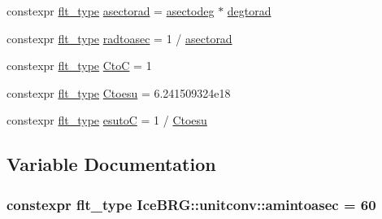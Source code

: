 \begin{DoxyCompactItemize}
constexpr \hyperlink{lib_2IceBRG__main_2common_8h_ad0f130a56eeb944d9ef2692ee881ecc4}{flt\+\_\+type} \hyperlink{namespaceIceBRG_1_1unitconv_aac89183abac5a460b75c78424824797c}{asectorad} = \hyperlink{namespaceIceBRG_1_1unitconv_a423c3f9f72df329bc63f5401785a09d2}{asectodeg} $\ast$ \hyperlink{namespaceIceBRG_1_1unitconv_a4c6ac59ab3c4791eb00efcc673a392d3}{degtorad}
\item 
constexpr \hyperlink{lib_2IceBRG__main_2common_8h_ad0f130a56eeb944d9ef2692ee881ecc4}{flt\+\_\+type} \hyperlink{namespaceIceBRG_1_1unitconv_a09a2034ad6ab76378b92efbd0ad5b137}{radtoasec} = 1 / \hyperlink{namespaceIceBRG_1_1unitconv_aac89183abac5a460b75c78424824797c}{asectorad}
\item 
constexpr \hyperlink{lib_2IceBRG__main_2common_8h_ad0f130a56eeb944d9ef2692ee881ecc4}{flt\+\_\+type} \hyperlink{namespaceIceBRG_1_1unitconv_a8cfff2b62437e07dd4e75260e1e5ce95}{Cto\+C} = 1
\item 
constexpr \hyperlink{lib_2IceBRG__main_2common_8h_ad0f130a56eeb944d9ef2692ee881ecc4}{flt\+\_\+type} \hyperlink{namespaceIceBRG_1_1unitconv_a53360211812748d35f99d2fa652b173b}{Ctoesu} = 6.\+241509324e18
\item 
constexpr \hyperlink{lib_2IceBRG__main_2common_8h_ad0f130a56eeb944d9ef2692ee881ecc4}{flt\+\_\+type} \hyperlink{namespaceIceBRG_1_1unitconv_aecc45391d888e1a1b87d1bfe36739b9a}{esuto\+C} = 1 / \hyperlink{namespaceIceBRG_1_1unitconv_a53360211812748d35f99d2fa652b173b}{Ctoesu}
\end{DoxyCompactItemize}


\subsection{Variable Documentation}
\hypertarget{namespaceIceBRG_1_1unitconv_a5d7925c49f5a3c729d73a2471f4ca012}{}
\subsubsection[{amintoasec}]{\setlength{\rightskip}{0pt plus 5cm}constexpr {\bf flt\+\_\+type} Ice\+B\+R\+G\+::unitconv\+::amintoasec = 60}\label{namespaceIceBRG_1_1unitconv_a5d7925c49f5a3c729d73a2471f4ca012}
\hypertarget{namespaceIceBRG_1_1unitconv_a9f2c4441a3294623935c4f9d11bf23b6}{}
